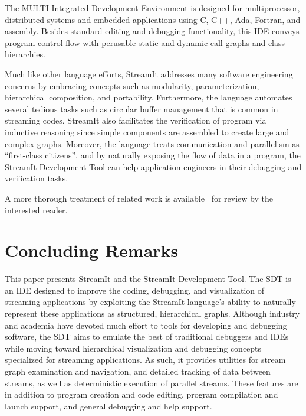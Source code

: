 \documentclass[times, 10pt,twocolumn]{article}
\begin{document}
The MULTI Integrated Development Environment is designed for
multiprocessor, distributed systems and embedded applications using C,
C++,  Ada,  Fortran,  and   assembly.  Besides  standard  editing  and
debugging functionality,  this IDE  conveys program control  flow with
perusable  static and dynamic  call graphs  and class  hierarchies.

Much  like other  language efforts,  StreamIt addresses  many software
engineering  concerns  by   embracing  concepts  such  as  modularity,
parameterization,         hierarchical         composition,         and
portability. Furthermore, the language automates several tedious tasks
such as circular buffer management  that is common in streaming codes.
StreamIt also  facilitates the  verification of program  via inductive
reasoning since  simple components are  assembled to create  large and
complex  graphs.   Moreover,  the  language treats  communication  and
parallelism as ``first-class citizens'', and by naturally exposing the
flow  of data  in a  program, the  StreamIt Development  Tool  can help
application engineers in their debugging and verification tasks.

A     more     thorough    treatment     of     related    work     is
available~\cite{kuo-thesis} for review by the interested reader.


\section{Concluding Remarks}
\label{sec:cr}

This paper  presents StreamIt and  the StreamIt Development  Tool. The
SDT  is  an  IDE  designed  to  improve  the  coding,  debugging,  and
visualization  of streaming  applications by  exploiting  the StreamIt
language's  ability  to  naturally  represent  these  applications  as
structured, hierarchical graphs.   Although industry and academia have
devoted much  effort to tools  for developing and  debugging software,
the SDT  aims to  emulate the best  of traditional debuggers  and IDEs
while moving toward  hierarchical visualization and debugging concepts
specialized  for   streaming  applications.   As   such,  it  provides
utilities for  stream graph  examination and navigation,  and detailed
tracking of  data between streams, as well  as deterministic execution
of  parallel  streams.  These  features  are  in  addition to  program
creation and code editing, program compilation and launch support, and
general debugging and help support.
\end{document}
